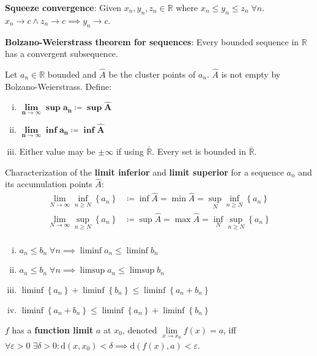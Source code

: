 \documentclass[letterpaper,11pt]{amsart}
\newcommand{\dist}[2]{\textrm{d}\left( {#1}, {#2} \right)}
\newcommand{\reals}{\mathbb{R}}
\newcommand{\keyphrase}[1]{\textbf{#1}}
\begin{document}
\keyphrase{Squeeze convergence}: Given $x_{n}, y_{n}, z_{n} \in \reals$
where $x_{n} \leq y_{n} \leq z_{n}\;\forall{}n$.
$x_{n} \to c \wedge z_{n} \to c \implies y_{n} \to c$.

\keyphrase{Bolzano-Weierstrass theorem for sequences}:
Every bounded sequence in $\reals{}$ has a convergent subsequence.

Let $a_{n}\in\reals$ bounded and $\hat{A}$ be the cluster points of $a_{n}$.
$\hat{A}$ is not empty by Bolzano-Weierstrass.  Define:
\begin{enumerate}[(i)]
    \item $\boldsymbol{\lim\limits_{n\to\infty}\sup a_{n}\coloneqq\sup\hat{A}}$
    \item $\boldsymbol{\lim\limits_{n\to\infty}\inf a_{n}\coloneqq\inf\hat{A}}$
    \item Either value may be $\pm \infty$ if using $\bar{\reals}$.  Every
        set is bounded in $\bar{\reals}$.
\end{enumerate}

Characterization of the \keyphrase{limit inferior} and
\keyphrase{limit superior} for a sequence $a_{n}$
and its accumulation points $\hat{A}$:
\begin{align*}
    \lim_{N\to\infty} \inf_{n\geq{}N} \left\{ a_{n} \right\} 
    &\coloneqq \inf \hat{A}
    = \min \hat{A}
    = \sup_{N} \inf_{n\geq{}N} \left\{ a_{n} \right\}
    \\
    \lim_{N\to\infty} \sup_{n\geq{}N} \left\{ a_{n} \right\}
    &\coloneqq \sup \hat{A}
    = \max \hat{A}
    = \inf_{N} \sup_{n\geq{}N} \left\{ a_{n} \right\}
    \\
\end{align*}
\begin{enumerate}[(i)]
    \item $a_{n}\leq{}b_{n}\;\forall n \implies\liminf a_{n}\leq{}\liminf b_{n}$
    \item $a_{n}\leq{}b_{n}\;\forall n \implies\limsup a_{n}\leq{}\limsup b_{n}$
    \item $\liminf \left\{a_{n}\right\} + \liminf \left\{b_{n}\right\} 
        \leq \liminf \left\{ a_{n}+b_{n} \right\}$
    \item $\liminf \left\{ a_{n}+b_{n} \right\}
        \leq \liminf \left\{a_{n}\right\} + \liminf \left\{b_{n}\right\}$
\end{enumerate}

$f$ has a \keyphrase{function limit} $a$ at $x_{0}$,
denoted $\lim\limits_{x\to{}x_{0}} f(x) = a$, iff
$\forall{}\varepsilon>0\;\exists{}\delta>0
:\dist{x}{x_{0}} < \delta \implies \dist{f(x)}{a} < \varepsilon$.
\end{document}
